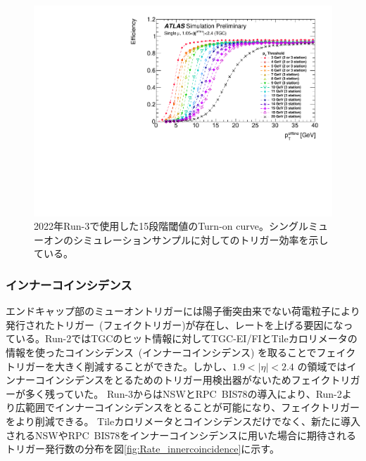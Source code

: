 \begin{figure}[tb]
  \centering
  \includegraphics[clip, width=12cm]{fig/3/PLOT-TRIG-2020-01-fig1.pdf}
  \caption{2022年Run-3で使用した15段階閾値のTurn-on curve。シングルミューオンのシミュレーションサンプルに対してのトリガー効率を示している。}
  \label{fig:Run3_15_MC5}
\end{figure}


\subsubsection{インナーコインシデンス}\label{innnercoin}
エンドキャップ部のミューオントリガーには陽子衝突由来でない荷電粒子により発行されたトリガー~(フェイクトリガー)が存在し、レートを上げる要因になっている。Run-2ではTGCのヒット情報に対してTGC-EI/FIとTileカロリメータの情報を使ったコインシデンス~(インナーコインシデンス) を取ることでフェイクトリガーを大きく削減することができた。しかし、$1.9 < |\eta| < 2.4$ の領域ではインナーコインシデンスをとるためのトリガー用検出器がないためフェイクトリガーが多く残っていた。
Run-3からはNSWとRPC~BIS78の導入により、Run-2より広範囲でインナーコインシデンスをとることが可能になり、フェイクトリガーをより削減できる。
Tileカロリメータとコインシデンスだけでなく、新たに導入されるNSWやRPC~BIS78をインナーコインシデンスに用いた場合に期待されるトリガー発行数の分布を図\ref{fig:Rate_innercoincidence}に示す。

